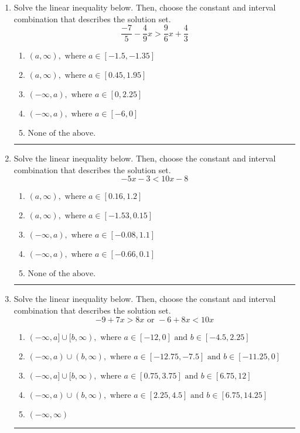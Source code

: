 \documentclass[14pt]{extbook}
\newcommand{\litem}[1]{\item#1\hspace*{-1cm}\rule{\textwidth}{0.4pt}}
\begin{document}
\begin{enumerate}
{\begin{enumerate}[label=\Alph*.]
\end{enumerate} }
\litem{
Solve the linear inequality below. Then, choose the constant and interval combination that describes the solution set.\[ \frac{-7}{5} - \frac{4}{9} x > \frac{9}{6} x + \frac{4}{3} \]\begin{enumerate}[label=\Alph*.]
\item \( (a, \infty), \text{ where } a \in [-1.5, -1.35] \)
\item \( (a, \infty), \text{ where } a \in [0.45, 1.95] \)
\item \( (-\infty, a), \text{ where } a \in [0, 2.25] \)
\item \( (-\infty, a), \text{ where } a \in [-6, 0] \)
\item \( \text{None of the above}. \)

\end{enumerate} }
\litem{
Solve the linear inequality below. Then, choose the constant and interval combination that describes the solution set.\[ -5x -3 < 10x -8 \]\begin{enumerate}[label=\Alph*.]
\item \( (a, \infty), \text{ where } a \in [0.16, 1.2] \)
\item \( (a, \infty), \text{ where } a \in [-1.53, 0.15] \)
\item \( (-\infty, a), \text{ where } a \in [-0.08, 1.1] \)
\item \( (-\infty, a), \text{ where } a \in [-0.66, 0.1] \)
\item \( \text{None of the above}. \)

\end{enumerate} }
\litem{
Solve the linear inequality below. Then, choose the constant and interval combination that describes the solution set.\[ -9 + 7 x > 8 x \text{ or } -6 + 8 x < 10 x \]\begin{enumerate}[label=\Alph*.]
\item \( (-\infty, a] \cup [b, \infty), \text{ where } a \in [-12, 0] \text{ and } b \in [-4.5, 2.25] \)
\item \( (-\infty, a) \cup (b, \infty), \text{ where } a \in [-12.75, -7.5] \text{ and } b \in [-11.25, 0] \)
\item \( (-\infty, a] \cup [b, \infty), \text{ where } a \in [0.75, 3.75] \text{ and } b \in [6.75, 12] \)
\item \( (-\infty, a) \cup (b, \infty), \text{ where } a \in [2.25, 4.5] \text{ and } b \in [6.75, 14.25] \)
\item \( (-\infty, \infty) \)


\end{enumerate}}
\end{enumerate}
\end{document}
